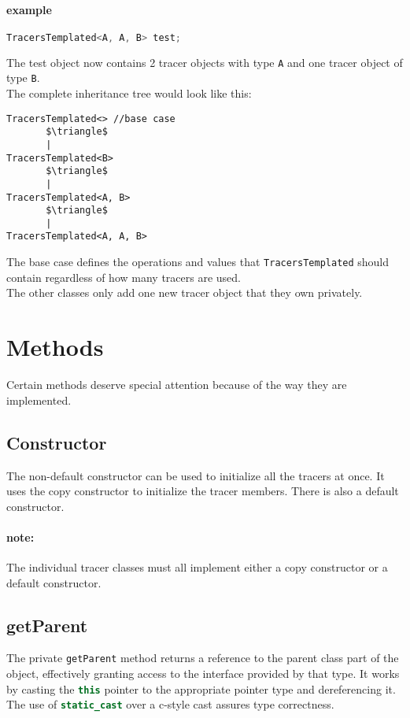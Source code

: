 \documentclass[12pt]{article}
\newcommand{\inlinecpp}[1]{\lstinline[language=c++]{#1}}
\begin{document}
\paragraph{example}
\begin{lstlisting}[language=c++]
TracersTemplated<A, A, B> test;
\end{lstlisting}
The test object now contains 2 tracer objects with type \inlinecpp{A} and one tracer object of type \inlinecpp{B}.\\
The complete inheritance tree would look like this:
\begin{lstlisting}
TracersTemplated<> //base case
       $\triangle$
       |
TracersTemplated<B>
       $\triangle$
       |
TracersTemplated<A, B>
       $\triangle$
       |
TracersTemplated<A, A, B>
\end{lstlisting}
The base case defines the operations and values that \inlinecpp{TracersTemplated} should contain regardless of how many tracers are used.\\
The other classes only add one new tracer object that they own privately.


\section{Methods}
Certain methods deserve special attention because of the way they are implemented.
\subsection{Constructor}
The non-default constructor can be used to initialize all the tracers at once. It uses the copy constructor to initialize the tracer members. There is also a default constructor.\\
\paragraph{note:} The individual tracer classes must all implement either a copy constructor or a default constructor.
\subsection{getParent}
The private \inlinecpp{getParent} method returns a reference to the parent class part of the object, effectively granting access to the interface provided by that type. It works by casting the \inlinecpp{this} pointer to the appropriate pointer type and dereferencing it. The use of \inlinecpp{static_cast} over a c-style cast assures type correctness.
\end{document}
